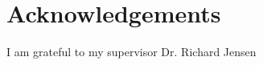 \thispagestyle{empty}


\section*{\centering Acknowledgements}


I am grateful to my supervisor Dr. Richard Jensen

